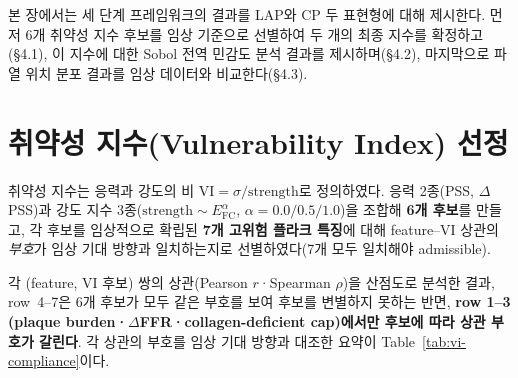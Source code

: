 \documentclass[master,english,final]{kaist-ucs}
\begin{document}
본 장에서는 세 단계 프레임워크의 결과를 LAP와 CP 두 표현형에 대해 제시한다. 먼저 6개 취약성 지수 후보를 임상 기준으로 선별하여 두 개의 최종 지수를 확정하고(\S4.1), 이 지수에 대한 Sobol 전역 민감도 분석 결과를 제시하며(\S4.2), 마지막으로 파열 위치 분포 결과를 임상 데이터와 비교한다(\S4.3).

\section{취약성 지수(Vulnerability Index) 선정}

취약성 지수는 응력과 강도의 비 $\mathrm{VI} = \sigma/\mathrm{strength}$로 정의하였다. 응력 2종(PSS, $\Delta$PSS)과 강도 지수 3종($\mathrm{strength}\sim E_\mathrm{FC}^{\alpha}$, $\alpha = 0.0/0.5/1.0$)을 조합해 \textbf{6개 후보}를 만들고, 각 후보를 임상적으로 확립된 \textbf{7개 고위험 플라크 특징}에 대해 feature--VI 상관의 \emph{부호}가 임상 기대 방향과 일치하는지로 선별하였다(7개 모두 일치해야 admissible).


각 (feature, VI 후보) 쌍의 상관(Pearson $r$·Spearman $\rho$)을 산점도로 분석한 결과, row~4--7은 6개 후보가 모두 같은 부호를 보여 후보를 변별하지 못하는 반면, \textbf{row 1--3 (plaque burden·$\Delta$FFR·collagen-deficient cap)에서만 후보에 따라 상관 부호가 갈린다}. 각 상관의 부호를 임상 기대 방향과 대조한 요약이 Table~\ref{tab:vi-compliance}이다.
\end{document}
